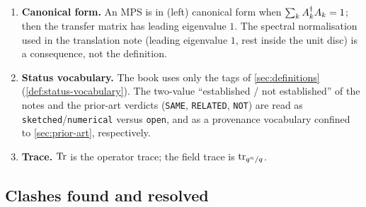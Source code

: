 \begin{enumerate}
  that $\expsum{n} = -\sum_i\alphaw{i}^n$ for all $n$ and
  $L = \prod_i(1-\alphaw{i}\uz)$, the standard normalisation of the
  $L$-function of an exponential sum. The curve count is
  $\Ncount{n} = \qs^n + 1 - \sum_i\alphaw{i}^n$.
  \item \textbf{Canonical form.} An MPS is in (left) canonical form when
  $\sum_kA_{k}^\dagger A_{k} = 1$; then the transfer matrix has leading
  eigenvalue $1$. The spectral normalisation used in the translation note
  (leading eigenvalue $1$, rest inside the unit disc) is a consequence, not
  the definition.
  \item \textbf{Status vocabulary.} The book uses only the tags of
  \cref{sec:definitions} (\cref{def:status-vocabulary}). The
  two-value ``established / not established'' of the notes and the prior-art
  verdicts (\texttt{SAME}, \texttt{RELATED}, \texttt{NOT}) are read as
  \texttt{sketched}/\texttt{numerical} versus \texttt{open}, and as a
  provenance vocabulary confined to \cref{sec:prior-art}, respectively.
  \item \textbf{Trace.} $\operatorname{Tr}$ is the operator trace; the field trace is
  $\operatorname{tr}_{q^n/q}$.
\end{enumerate}

\subsection{Clashes found and resolved}

